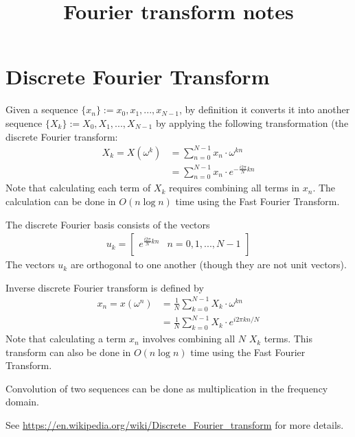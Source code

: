 \documentclass[11pt]{article}
\title{Fourier transform notes}
\newcommand{\eq}[1]{\begin{align*}#1\end{align*}}
\begin{document}
\maketitle

\section{Discrete Fourier Transform}

Given a sequence $\{x_n\} := x_0, x_1, ..., x_{N-1}$, by definition it converts it into another sequence $\{X_k\}:= X_0,X_1,...,X_{N-1}$ by applying the following transformation (the discrete Fourier transform:
\eq{
X_k = X(\omega^k) &= \sum_{n=0}^{N-1} x_n \cdot \omega^{kn} \\
&= \sum_{n=0}^{N-1} x_n \cdot e^{-\frac{i2\pi}{N}kn}
}
Note that calculating each term of $X_k$ requires combining all terms in $x_n$. The calculation can be done in $O(n \log n)$ time using the Fast Fourier Transform.

The discrete Fourier basis consists of the vectors
\eq{
u_k = \left[\begin{array}{c|c}
e^{\frac{i2\pi}{N}kn} & n = 0,1,...,N-1 \\
\end{array}\right]
}
The vectors $u_k$ are orthogonal to one another (though they are not unit vectors).

Inverse discrete Fourier transform is defined by
\eq{
x_n = x(\omega^n) &= \frac{1}{N}\sum_{k=0}^{N-1} X_k \cdot \omega^{kn} \\
&= \frac{1}{N}\sum_{k=0}^{N-1} X_k \cdot e^{i2\pi kn/N}
}
Note that calculating a term $x_n$ involves combining all $N$ $X_k$ terms. This transform can also be done in $O(n \log n)$ time using the Fast Fourier Transform.

Convolution of two sequences can be done as multiplication in the frequency domain.

See \url{https://en.wikipedia.org/wiki/Discrete_Fourier_transform} for more details.
\end{document}
